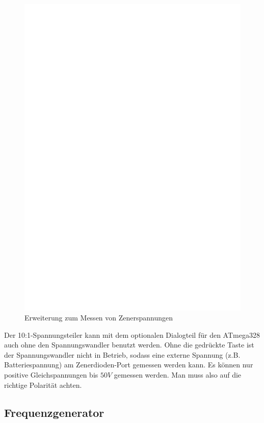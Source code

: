 \begin{figure}[H]
\centering
\includegraphics[width=18cm]{../FIG/zener_exp.eps}
\caption{Erweiterung zum Messen von Zenerspannungen}
\label{fig:zener}
\end{figure}

Der 10:1-Spannungsteiler kann mit dem optionalen Dialogteil für den ATmega328 auch ohne 
den Spannungswandler benutzt werden. Ohne die gedrückte Taste ist der Spannungswandler nicht in 
Betrieb, sodass eine externe Spannung (z.B. Batteriespannung) am Zenerdioden-Port gemessen werden kann.
Es können nur positive Gleichspannungen bis \(50V\) gemessen werden.
Man muss also auf die richtige Polarität achten.

\subsection{Frequenzgenerator}

